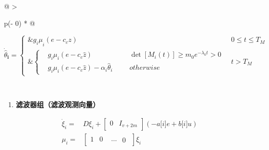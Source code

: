 \documentclass[
  12pt,
  a4paper
]{article}
\begin{document}
\begin{longtable}[]{@{}
  >{\raggedright\arraybackslash}p{}@{}}
\begin{minipage}[t]{\linewidth}
\[{\dot{\widehat{\theta}}}_{\mathbf{i}}\mathbf{=}\left\{ \begin{aligned}
\mathbf{\&}{g_{i}\mu}_{i}\left( e - c_{c}\widehat{z} \right) & 0 \leq t \leq T_{M} \\
\mathbf{\&}\left\{ \begin{array}{rlrlr}
 & g_{i}\mu_{i}\left( e - c_{c}\widehat{z} \right) & & & \det\left\lbrack M_{i}(t) \right\rbrack \geq m_{0}e^{- \lambda_{0}t} > 0 \\
 & g_{i}\mu_{i}\left( e - c_{c}\widehat{z} \right) - \alpha_{i}{\widehat{\theta}}_{i} & & & otherwise
\end{array} \right.\  & t > T_{M}
\end{aligned} \right.\ \]
\end{minipage} \\
\begin{minipage}[t]{\linewidth}\raggedright
\begin{enumerate}
\def\labelenumi{\arabic{enumi}.}
\setcounter{enumi}{2}
\item
  \textbf{滤波器组（滤波观测向量）}
\end{enumerate}

\[\begin{aligned}
{\dot{\xi}}_{i} = & D\xi_{i} + \begin{bmatrix}
0 & I_{v + 2m}
\end{bmatrix}\left( - a\lbrack i\rbrack e + b\lbrack i\rbrack u \right) \\
\mu_{i} = & \begin{bmatrix}
1 & 0 & \begin{matrix}
\cdots & 0
\end{matrix}
\end{bmatrix}\xi_{i}
\end{aligned}\]


\end{minipage}
\end{longtable}
\end{document}
